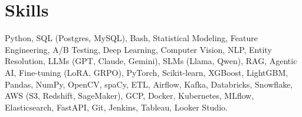 \documentclass[letterpaper,11pt]{article}
\begin{document}

 \section{Skills}
 \begin{itemize}[leftmargin=0.15in, label={}]
    \footnotesize{\item{ Python, SQL (Postgres, MySQL), Bash, Statistical Modeling, Feature Engineering, A/B Testing, Deep Learning, Computer Vision, NLP, Entity Resolution, LLMs (GPT, Claude, Gemini), SLMs (Llama, Qwen), RAG, Agentic AI, Fine-tuning (LoRA, GRPO), PyTorch, Scikit-learn, XGBoost, LightGBM, Pandas, NumPy, OpenCV, spaCy, ETL, Airflow, Kafka, Databricks, Snowflake, AWS (S3, Redshift, SageMaker), GCP, Docker, Kubernetes, MLflow, Elasticsearch, FastAPI, Git, Jenkins, Tableau, Looker Studio.
    }}
    \vspace{-5pt}
 \end{itemize}
\end{document}
